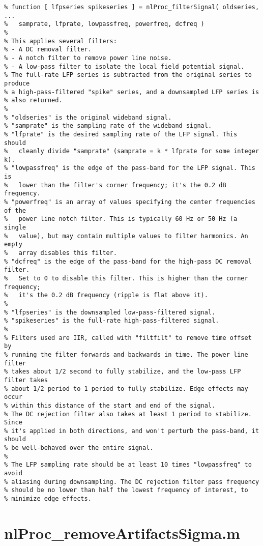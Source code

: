 \begin{verbatim}
% function [ lfpseries spikeseries ] = nlProc_filterSignal( oldseries, ...
%   samprate, lfprate, lowpassfreq, powerfreq, dcfreq )
%
% This applies several filters:
% - A DC removal filter.
% - A notch filter to remove power line noise.
% - A low-pass filter to isolate the local field potential signal.
% The full-rate LFP series is subtracted from the original series to produce
% a high-pass-filtered "spike" series, and a downsampled LFP series is
% also returned.
%
% "oldseries" is the original wideband signal.
% "samprate" is the sampling rate of the wideband signal.
% "lfprate" is the desired sampling rate of the LFP signal. This should
%   cleanly divide "samprate" (samprate = k * lfprate for some integer k).
% "lowpassfreq" is the edge of the pass-band for the LFP signal. This is
%   lower than the filter's corner frequency; it's the 0.2 dB frequency.
% "powerfreq" is an array of values specifying the center frequencies of the
%   power line notch filter. This is typically 60 Hz or 50 Hz (a single
%   value), but may contain multiple values to filter harmonics. An empty
%   array disables this filter.
% "dcfreq" is the edge of the pass-band for the high-pass DC removal filter.
%   Set to 0 to disable this filter. This is higher than the corner frequency;
%   it's the 0.2 dB frequency (ripple is flat above it).
%
% "lfpseries" is the downsampled low-pass-filtered signal.
% "spikeseries" is the full-rate high-pass-filtered signal.
%
% Filters used are IIR, called with "filtfilt" to remove time offset by
% running the filter forwards and backwards in time. The power line filter
% takes about 1/2 second to fully stabilize, and the low-pass LFP filter takes
% about 1/2 period to 1 period to fully stabilize. Edge effects may occur
% within this distance of the start and end of the signal.
% The DC rejection filter also takes at least 1 period to stabilize. Since
% it's applied in both directions, and won't perturb the pass-band, it should
% be well-behaved over the entire signal.
%
% The LFP sampling rate should be at least 10 times "lowpassfreq" to avoid
% aliasing during downsampling. The DC rejection filter pass frequency
% should be no lower than half the lowest frequency of interest, to
% minimize edge effects.
\end{verbatim}

\section{nlProc\_removeArtifactsSigma.m}

